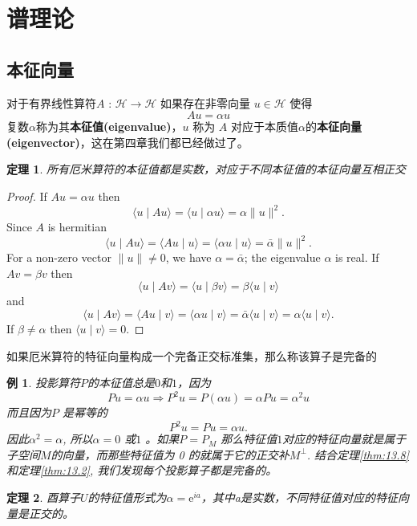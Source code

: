 \documentclass[hyperref,UTF8]{ctexbook}
\newtheorem{eg}{例}[chapter]
\newtheorem{theorem}{定理}[chapter]
\begin{document}
\section{谱理论}
\subsection{本征向量}
对于有界线性算符\(A\) : \(\mathcal{H} \rightarrow \mathcal{H}\) 如果存在非零向量 \(u \in \mathcal{H}\) 使得
\[
A u=\alpha u 
\]
复数\(\alpha\)称为其\textbf{本征值(eigenvalue)}，\(u\) 称为 \(A\) 对应于本质值\(\alpha\)的\textbf{本征向量(eigenvector)}，这在第四章我们都已经做过了。
\begin{theorem}\label{thm:13.15}
    所有厄米算符的本征值都是实数，对应于不同本征值的本征向量互相正交
\end{theorem}
\begin{proof}
If \(A u=\alpha u\) then
\[
\langle u \mid A u\rangle=\langle u \mid \alpha u\rangle=\alpha\|u\|^{2} .
\]
Since \(A\) is hermitian
\[
\langle u \mid A u\rangle=\langle A u \mid u\rangle=\langle\alpha u \mid u\rangle=\bar{\alpha}\|u\|^{2} .
\]
For a non-zero vector \(\|u\| \neq 0\), we have \(\alpha=\bar{\alpha}\); the eigenvalue \(\alpha\) is real.
If \(A v=\beta v\) then
\[
\langle u \mid A v\rangle=\langle u \mid \beta v\rangle=\beta\langle u \mid v\rangle
\]
and
\[
\langle u \mid A v\rangle=\langle A u \mid v\rangle=\langle\alpha u \mid v\rangle=\bar{\alpha}\langle u \mid v\rangle=\alpha\langle u \mid v\rangle .
\]
If \(\beta \neq \alpha\) then \(\langle u \mid v\rangle=0\).
\end{proof}
如果厄米算符的特征向量构成一个完备正交标准集，那么称该算子是完备的
\begin{eg} 
投影算符\(P\)的本征值总是\(0\)和\(1\)，因为
\[
P u=\alpha u \Longrightarrow P^{2} u=P(\alpha u)=\alpha P u=\alpha^{2} u
\]
而且因为\(P\) 是幂等的
\[
P^{2} u=P u=\alpha u .
\]
因此\(\alpha^{2}=\alpha\), 所以\(\alpha=0\) 或\(1\) 。如果\(P=P_{M}\) 那么特征值\(1\)对应的特征向量就是属于子空间\(M\)的向量，而那些特征值为 0 的就属于它的正交补\(M^{\perp}\). 结合定理\ref{thm:13.8} 和定理\ref{thm:13.2}, 我们发现每个投影算子都是完备的。
\end{eg} 
\begin{theorem}
    酉算子\(U\)的特征值形式为\(\alpha=\mathrm{e}^{i a}\)，其中a是实数，不同特征值对应的特征向量是正交的。
\end{theorem}
\end{document}
